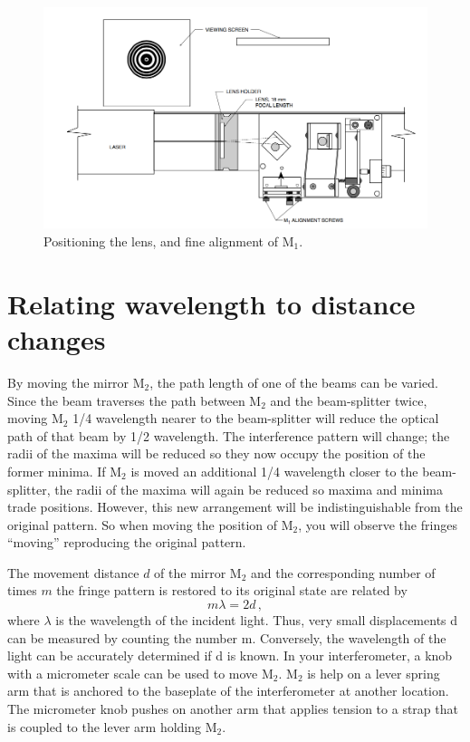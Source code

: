 \begin{enumerate}
	\begin{figure}
		\centering
		\includegraphics[width=\textwidth]{michelson-interferometer/positioning-lens.png}
		\caption{Positioning the lens, and fine alignment of M$_1$.}\label{mi:fig:positioning-lens}
	\end{figure}

\end{enumerate}

\section{Relating wavelength to distance changes}

By moving the mirror M$_2$, the path length of one of the beams can be varied. Since the beam traverses the path
between M$_2$ and the beam-splitter twice, moving M$_2$ 1/4 wavelength nearer to the beam-splitter will reduce the optical
path of that beam by 1/2 wavelength. The interference pattern will change; the radii of the maxima will be reduced so
they now occupy the position of the former minima. If M$_2$ is moved an additional 1/4 wavelength closer to the beam-splitter, the radii of the maxima will again be reduced so maxima and minima trade positions. However, this new
arrangement will be indistinguishable from the original pattern. So when moving the position of M$_2$, you will observe the
fringes ``moving'' reproducing the original pattern.

The movement distance $d$ of the mirror M$_2$ and the corresponding number of times $m$ the fringe pattern is restored to its original state are related by
\begin{equation}\label{mi:eq:interference}
 m \lambda = 2 d \, ,
\end{equation}
where $\lambda$ is the wavelength of the incident light. Thus, very small displacements d can be measured by counting the number m. Conversely, the wavelength of the light
can be accurately determined if d is known. In your interferometer, a knob with a micrometer scale can be used to move
M$_2$. M$_2$ is help on a lever spring arm that is anchored to the baseplate of the interferometer at another location. The
micrometer knob pushes on another arm that applies tension to a strap that is coupled to the lever arm holding M$_2$.

